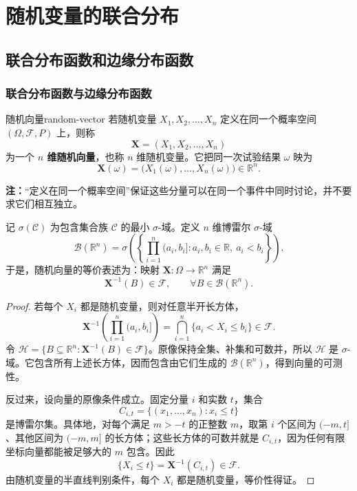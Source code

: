 \chapter{随机变量的联合分布}

\section{联合分布函数和边缘分布函数}
\label{sec:joint-and-marginal-cdf}

\subsection*{联合分布函数与边缘分布函数}

\begin{mydefinition}{随机向量}{random-vector}
若随机变量 $X_1,X_2,\ldots,X_n$ 定义在同一个概率空间 $(\Omega,\mathcal F,P)$ 上，则称
\[
\boldsymbol X=(X_1,X_2,\ldots,X_n)
\]
为一个 \textbf{$n$ 维随机向量}，也称 $n$ 维随机变量。它把同一次试验结果 $\omega$ 映为
\[
\boldsymbol X(\omega)=\bigl(X_1(\omega),\ldots,X_n(\omega)\bigr)\in\mathbb R^n.
\]
\end{mydefinition}

\textbf{注：}\quad “定义在同一个概率空间”保证这些分量可以在同一个事件中同时讨论，并不要求它们相互独立。

记 $\sigma(\mathcal C)$ 为包含集合族 $\mathcal C$ 的最小 $\sigma$-域。定义 $n$ 维博雷尔 $\sigma$-域
\[
\mathcal B(\mathbb R^n)
=\sigma\left(
\left\{\prod_{i=1}^n(a_i,b_i]:
a_i,b_i\in\mathbb R,\ a_i<b_i\right\}
\right).
\]
于是，随机向量的等价表述为：映射 $\boldsymbol X:\Omega\to\mathbb R^n$ 满足
\[
\boldsymbol X^{-1}(B)\in\mathcal F,
\qquad \forall B\in\mathcal B(\mathbb R^n).
\]

\begin{proof}

若每个 $X_i$ 都是随机变量，则对任意半开长方体，
\[
\boldsymbol X^{-1}\left(\prod_{i=1}^n(a_i,b_i]\right)
=\bigcap_{i=1}^n\{a_i<X_i\leq b_i\}\in\mathcal F.
\]
令 $\mathcal H=\{B\subseteq\mathbb R^n:\boldsymbol X^{-1}(B)\in\mathcal F\}$。原像保持全集、补集和可数并，所以 $\mathcal H$ 是 $\sigma$-域。它包含所有上述长方体，因而包含由它们生成的 $\mathcal B(\mathbb R^n)$，得到向量的可测性。

反过来，设向量的原像条件成立。固定分量 $i$ 和实数 $t$，集合
\[
C_{i,t}=\{(x_1,\ldots,x_n):x_i\leq t\}
\]
是博雷尔集。具体地，对每个满足 $m>-t$ 的正整数 $m$，取第 $i$ 个区间为 $(-m,t]$、其他区间为 $(-m,m]$ 的长方体；这些长方体的可数并就是 $C_{i,t}$，因为任何有限坐标向量都能被足够大的 $m$ 包含。因此
\[
\{X_i\leq t\}=\boldsymbol X^{-1}(C_{i,t})\in\mathcal F.
\]
由随机变量的半直线判别条件，每个 $X_i$ 都是随机变量，等价性得证。
\end{proof}

